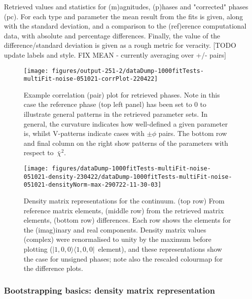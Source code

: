 \documentclass[10pt]{article}
\begin{document}
\begin{table}
\caption{{\label{tab:matE}Retrieved values and statistics for (m)agnitudes, (p)hases and "corrected" phases (pc). For each type and parameter the mean result from the fits is given, along with the standard deviation, and a comparison to the (ref)erence computational data, with absolute and percentage differences. Finally, the value of the difference/standard deviation is given as a rough metric for veracity. [TODO update labels and style. FIX MEAN - currently averaging over +/- pairs]}}
\end{table}
\begin{figure}[H]
\begin{center}
\texttt{[image: figures/output-251-2/dataDump-1000fitTests-multiFit-noise-051021-corrPlot-220422]}
\caption{{Example correlation (pair) plot for retrieved phases. Note in this case
the reference phase (top left panel) has been set to 0 to illustrate
general patterns in the retrieved parameter sets. In general, the
curvature indicates how well-defined a given parameter is, whilst
V-patterns indicate cases with \(\pm\phi\) pairs. The bottom row
and final column on the right show patterns of the parameters with
respect to~\(\bar{\chi}^2\).
{\label{888108}}%
}}
\end{center}
\end{figure}
\begin{figure}[H]
\begin{center}
\texttt{[image: figures/dataDump-1000fitTests-multiFit-noise-051021-density-230422/dataDump-1000fitTests-multiFit-noise-051021-densityNorm-max-290722-11-30-03]}
\caption{{Density matrix representations for the continuum. (top row) From
reference matrix elements, (middle row) from the retrieved matrix
elements, (bottom row) differences. Each row shows the elements for the
(imag)inary and real components. Density matrix values (complex) were
renormalised to unity by the maximum before plotting
(\(|1,0,0\rangle \langle1,0,0|\)~element), and these representations show the case
for unsigned phases; note also the rescaled colourmap for the difference
plots.~
{\label{998904}}%
}}
\end{center}
\end{figure}

\subsubsection{Bootstrapping basics: density matrix representation\label{sec:den-mat-N2}}
\end{document}
